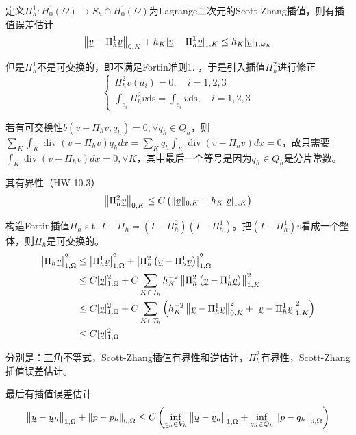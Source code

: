 定义$\Pi_h^1: H_0^1(\Omega) \to S_h \cap H_0^1(\Omega)$为Lagrange二次元的Scott-Zhang插值，则有插值误差估计
\[
  \left\|\undertilde{v}-\Pi_{h}^{1} \undertilde{v}\right\|_{0, K}+h_{K}|\undertilde{v}-\Pi_{h}^{1} \undertilde{v}|_{1, K} \le h_{K}|\undertilde{v}|_{1, \omega_{K}}
\]

但是$\Pi_h^1$不是可交换的，即不满足Fortin准则1. ，于是引入插值$\Pi_h^2$进行修正
\[
  \left\{\begin{array}{l}
    \Pi_{h}^{2} v\left(a_{i}\right)=0, \quad i = 1, 2, 3 \\
    \int_{e_{i}} \Pi_{h}^{2} v \mathrm{ds}=\int_{e_{i}} v \mathrm{ds}, \quad i = 1, 2, 3
  \end{array}\right.
\]

若有可交换性$b(v - \Pi_h v, q_h) = 0, \forall q_h \in Q_h$，则$\sum_K \int_K \operatorname{div}(v - \Pi_h v) q_h dx = \sum_K q_h \int_K \operatorname{div}(v - \Pi_h v) dx = 0$，故只需要$\int_K \operatorname{div}(v - \Pi_h v) dx = 0, \forall K$，其中最后一个等号是因为$q_h \in Q_h$是分片常数。

其有界性（HW 10.3）
\[
  \left\|\Pi_{h}^{2} \undertilde{v}\right\|_{0, K} \le C\left(\|\undertilde{v}\|_{0, K}+h_{K}|\undertilde{v}|_{1, K}\right)
\]

构造Fortin插值$\Pi_h$ s.t. $I - \Pi_h = (I - \Pi_h^2)(I - \Pi_h^1)$。把$(I - \Pi_h^1)v$看成一个整体，则$\Pi_h$是可交换的。
\[
  \begin{aligned}
    \left|\Pi_{h} \undertilde{v}\right|_{1, \Omega}^{2} & \le \left|\Pi_{h}^{1} \undertilde{v}\right|_{1, \Omega}^{2}+\left|\Pi_{h}^{2}\left(\undertilde{v}-\Pi_{h}^{1} \undertilde{v}\right)\right|_{1, \Omega}^{2}\\
    & \le C|\undertilde{v}|_{1, \Omega}^{2}+C \sum_{K \in \mathcal{T}_{h}} h_{K}^{-2}\left\|\Pi_{h}^{2}\left(\undertilde{v}-\Pi_{h}^{1} \undertilde{v}\right)\right\|_{1, K}^{2}\\
    & \le C|\undertilde{v}|_{1, \Omega}^{2}+C \sum_{K \in \mathcal{T}_{h}}\left(h_{K}^{-2}\left\|\undertilde{v}-\Pi_{h}^{1} \undertilde{v}\right\|_{0, K}^{2}+\left|\undertilde{v}-\Pi_{h}^{1} \undertilde{v}\right|_{1, K}^{2}\right)\\
    & \le C|\undertilde{v}|_{1, \Omega}^{2}
  \end{aligned}
\]

分别是：三角不等式，Scott-Zhang插值有界性和逆估计，$\Pi_h^2$有界性，Scott-Zhang插值误差估计。

最后有插值误差估计
\[
  \left\|\undertilde{u}-\undertilde{u}_{h}\right\|_{1, \Omega}+\left\|p-p_{h}\right\|_{0, \Omega} \leq C\left(\inf_{\undertilde{v}_{h} \in V_{h}}\left\|\undertilde{u}-\undertilde{v}_{h}\right\|_{1, \Omega}+\inf _{q_{h} \in Q_{h}}\left\|p-q_{h}\right\|_{0, \Omega}\right)
\]

